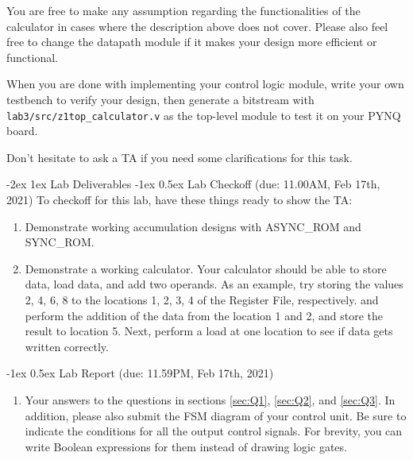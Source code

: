 \documentclass[11pt]{article}
\makeatletter
\renewcommand{\section}
{\@startsection {section}{1}{0pt}
 {-2ex}
 {1ex}
 {\bfseries\Large}}
\renewcommand{\subsection}
{\@startsection {subsection}{1}{0pt}
 {-1ex}
 {0.5ex}
 {\bfseries\normalsize}}
\makeatother
\begin{document}
{You are free to make any assumption regarding the functionalities of the calculator in cases where the description above does not cover. Please also feel free to change the datapath module if it makes your design more efficient or functional.

When you are done with implementing your control logic module, write your own testbench to verify your design, then generate a bitstream with \verb|lab3/src/z1top_calculator.v| as the top-level module to test it on your PYNQ board.

Don't hesitate to ask a TA if you need some clarifications for this task.

\section{Lab Deliverables}
\subsection{Lab Checkoff (due: 11.00AM, Feb 17th, 2021)}
To checkoff for this lab, have these things ready to show the TA:
\begin{enumerate}
  \item Demonstrate working accumulation designs with ASYNC\_ROM and SYNC\_ROM.
  \item Demonstrate a working calculator. Your calculator should be able to store data, load data, and add two operands. As an example, try storing the values 2, 4, 6, 8 to the locations 1, 2, 3, 4 of the Register File, respectively. and perform the addition of the data from the location 1 and 2, and store the result to location 5. Next, perform a load at one location to see if data gets written correctly.
\end{enumerate}

\subsection{Lab Report (due: 11.59PM, Feb 17th, 2021)}\label{sec:labreport}
\begin{enumerate}
  \item Your answers to the questions in sections \ref{sec:Q1}, \ref{sec:Q2}, and \ref{sec:Q3}. In addition, please also submit the FSM diagram of your control unit. Be sure to indicate the conditions for all the output control signals. For brevity, you can write Boolean expressions for them instead of drawing logic gates.
\end{enumerate}

}
\end{document}
